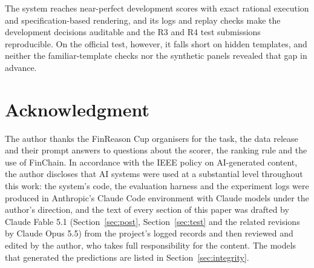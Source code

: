 \documentclass[conference]{IEEEtran}
\begin{document}
The system reaches near-perfect development scores with exact rational execution and specification-based rendering, and its logs and replay checks make the development decisions auditable and the R3 and R4 test submissions reproducible. On the official test, however, it falls short on hidden templates, and neither the familiar-template checks nor the synthetic panels revealed that gap in advance.

\section*{Acknowledgment}
The author thanks the FinReason Cup organisers for the task, the data release and their prompt answers to questions about the scorer, the ranking rule and the use of FinChain. In accordance with the IEEE policy on AI-generated content, the author discloses that AI systems were used at a substantial level throughout this work: the system's code, the evaluation harness and the experiment logs were produced in Anthropic's Claude Code environment with Claude models under the author's direction, and the text of every section of this paper was drafted by Claude Fable 5.1 (Section~\ref{sec:post}, Section~\ref{sec:test} and the related revisions by Claude Opus 5.5) from the project's logged records and then reviewed and edited by the author, who takes full responsibility for the content. The models that generated the predictions are listed in Section~\ref{sec:integrity}.



\end{document}
